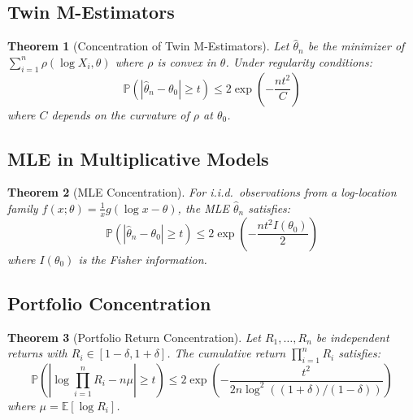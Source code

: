 \documentclass[11pt,twoside,openright]{book}
\theoremstyle{plain}
\newtheorem{theorem}{Theorem}[chapter]
\theoremstyle{definition}
\theoremstyle{remark}
\newcommand{\abs}[1]{|#1|}
\newcommand{\E}{\mathbb{E}}
\newcommand{\Prob}{\mathbb{P}}
\begin{document}
\subsection{Twin M-Estimators}

\begin{theorem}[Concentration of Twin M-Estimators]
\label{thm:twin-m-estimator}
Let $\hat{\theta}_n$ be the minimizer of $\sum_{i=1}^n \rho(\log X_i, \theta)$ where $\rho$ is convex in $\theta$. Under regularity conditions:
\begin{equation}
\Prob(|\hat{\theta}_n - \theta_0| \geq t) \leq 2\exp\left(-\frac{nt^2}{C}\right)
\label{eq:twin-m-concentration}
\end{equation}
where $C$ depends on the curvature of $\rho$ at $\theta_0$.
\end{theorem}

\subsection{MLE in Multiplicative Models}

\begin{theorem}[MLE Concentration]
\label{thm:mle-concentration}
For i.i.d.\ observations from a log-location family $f(x; \theta) = \frac{1}{x}g(\log x - \theta)$, the MLE $\hat{\theta}_n$ satisfies:
\begin{equation}
\Prob(|\hat{\theta}_n - \theta_0| \geq t) \leq 2\exp\left(-\frac{nt^2 I(\theta_0)}{2}\right)
\label{eq:mle-log-location}
\end{equation}
where $I(\theta_0)$ is the Fisher information.
\end{theorem}

\subsection{Portfolio Concentration}

\begin{theorem}[Portfolio Return Concentration]
\label{thm:portfolio-concentration}
Let $R_1, \ldots, R_n$ be independent returns with $R_i \in [1-\delta, 1+\delta]$. The cumulative return $\prod_{i=1}^n R_i$ satisfies:
\begin{equation}
\Prob\left(\abs{\log\prod_{i=1}^n R_i - n\mu} \geq t\right) \leq 2\exp\left(-\frac{t^2}{2n\log^2((1+\delta)/(1-\delta))}\right)
\label{eq:portfolio-concentration}
\end{equation}
where $\mu = \E[\log R_i]$.
\end{theorem}
\end{document}
